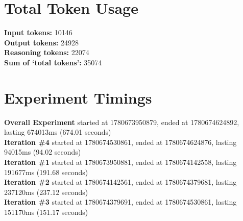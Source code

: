 \documentclass{article}
\begin{document}
\section*{Total Token Usage}
\textbf{Input tokens: }10146
\\\textbf{Output tokens: }24928
\\\textbf{Reasoning tokens: }22074
\\\textbf{Sum of `total tokens': }35074
\section*{Experiment Timings}
\textbf{Overall Experiment} started at 1780673950879, ended at 1780674624892, lasting 674013ms (674.01 seconds)
\\\textbf{Iteration \#4} started at 1780674530861, ended at 1780674624876, lasting 94015ms (94.02 seconds)
\\\textbf{Iteration \#1} started at 1780673950881, ended at 1780674142558, lasting 191677ms (191.68 seconds)
\\\textbf{Iteration \#2} started at 1780674142561, ended at 1780674379681, lasting 237120ms (237.12 seconds)
\\\textbf{Iteration \#3} started at 1780674379691, ended at 1780674530861, lasting 151170ms (151.17 seconds)
\end{document}
